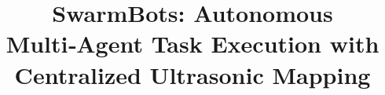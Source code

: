 \documentclass[conference]{IEEEtran}
\DeclareMathOperator*{\Res}{Res}
\begin{document}
\newtheorem{theorem}{Theorem}[section]
\newtheorem{problem}{Problem}
\newtheorem{proposition}{Proposition}[section]
\newtheorem{lemma}{Lemma}[section]
\newtheorem{corollary}[theorem]{Corollary}
\newtheorem{example}{Example}[section]
\newtheorem{definition}[problem]{Definition}
\newcommand{\BEQA}{\begin{eqnarray}}
\newcommand{\EEQA}{\end{eqnarray}}
\newcommand{\define}{\stackrel{\triangle}{=}}
\providecommand{\mbf}{\mathbf}
\providecommand{\pr}[1]{\ensuremath{\Pr\left(#1\right)}}
\providecommand{\qfunc}[1]{\ensuremath{Q\left(#1\right)}}
\providecommand{\sbrak}[1]{\ensuremath{{}\left[#1\right]}}
\providecommand{\lsbrak}[1]{\ensuremath{{}\left[#1\right.}}
\providecommand{\rsbrak}[1]{\ensuremath{{}\left.#1\right]}}
\providecommand{\brak}[1]{\ensuremath{\left(#1\right)}}
\providecommand{\lbrak}[1]{\ensuremath{\left(#1\right.}}
\providecommand{\rbrak}[1]{\ensuremath{\left.#1\right)}}
\providecommand{\cbrak}[1]{\ensuremath{\left\{#1\right\}}}
\providecommand{\lcbrak}[1]{\ensuremath{\left\{#1\right.}}
\providecommand{\rcbrak}[1]{\ensuremath{\left.#1\right\}}}
\theoremstyle{remark}
\newtheorem{rem}{Remark}
\newcommand{\sgn}{\mathop{\mathrm{sgn}}}
\providecommand{\abs}[1]{\left\vert#1\right\vert}
\providecommand{\res}[1]{\Res\displaylimits_{#1}} 
\providecommand{\norm}[1]{\left\lVert#1\right\rVert}
\providecommand{\mtx}[1]{\mathbf{#1}}
\providecommand{\mean}[1]{E\left[ #1 \right]}   
\providecommand{\fourier}{\overset{\mathcal{F}}{ \rightleftharpoons}}
\providecommand{\system}[1]{\overset{\mathcal{#1}}{ \longleftrightarrow}}
\newcommand{\solution}{\noindent \textbf{Solution: }}
\newcommand{\cosec}{\,\text{cosec}\,}
\providecommand{\dec}[2]{\ensuremath{\overset{#1}{\underset{#2}{\gtrless}}}}
\newcommand{\myvec}[1]{\ensuremath{\begin{pmatrix}#1\end{pmatrix}}}
\newcommand{\mydet}[1]{\ensuremath{\begin{vmatrix}#1\end{vmatrix}}}
\renewcommand{\vec}[1]{\boldsymbol{\mathbf{#1}}}
\def\putbox#1#2#3{\makebox[0in][l]{\makebox[#1][l]{}\raisebox{\baselineskip}[0in][0in]{\raisebox{#2}[0in][0in]{#3}}}}
     \def\rightbox#1{\makebox[0in][r]{#1}}
     \def\centbox#1{\makebox[0in]{#1}}
     \def\topbox#1{\raisebox{-\baselineskip}[0in][0in]{#1}}
     \def\midbox#1{\raisebox{-0.5\baselineskip}[0in][0in]{#1}}

\title{SwarmBots: Autonomous Multi‑Agent Task Execution with Centralized Ultrasonic Mapping}
\end{document}
